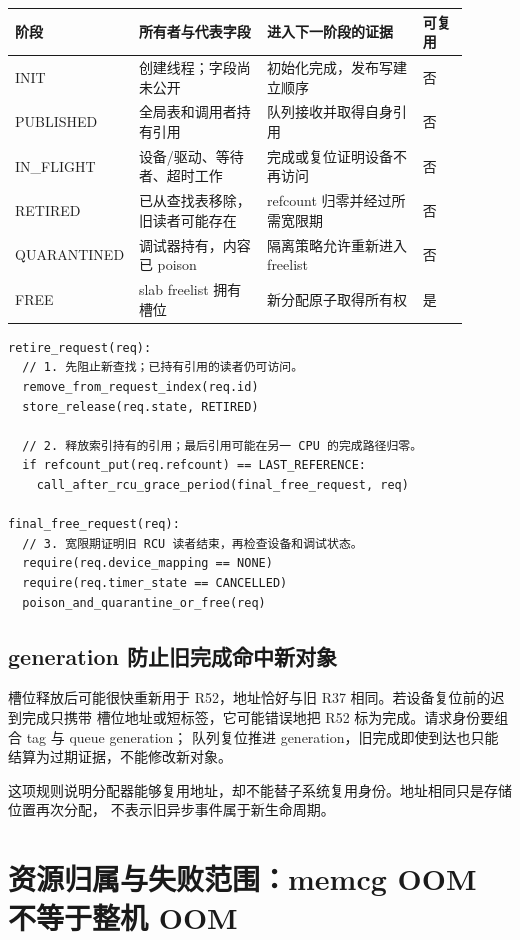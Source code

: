 \begin{longtable}{|L{0.18\linewidth}|L{0.28\linewidth}|L{0.34\linewidth}|L{0.1\linewidth}|}
\hline
阶段 & 所有者与代表字段 & 进入下一阶段的证据 & 可复用 \\ \hline
INIT & 创建线程；字段尚未公开 & 初始化完成，发布写建立顺序 & 否 \\\tablerowrule
PUBLISHED & 全局表和调用者持有引用 & 队列接收并取得自身引用 & 否 \\\tablerowrule
IN\_FLIGHT & 设备/驱动、等待者、超时工作 & 完成或复位证明设备不再访问 & 否 \\\tablerowrule
RETIRED & 已从查找表移除，旧读者可能存在 & refcount 归零并经过所需宽限期 & 否 \\\tablerowrule
QUARANTINED & 调试器持有，内容已 poison & 隔离策略允许重新进入 freelist & 否 \\\tablerowrule
FREE & slab freelist 拥有槽位 & 新分配原子取得所有权 & 是 \\
\hline
\end{longtable}

\begin{lstlisting}
retire_request(req):
  // 1. 先阻止新查找；已持有引用的读者仍可访问。
  remove_from_request_index(req.id)
  store_release(req.state, RETIRED)

  // 2. 释放索引持有的引用；最后引用可能在另一 CPU 的完成路径归零。
  if refcount_put(req.refcount) == LAST_REFERENCE:
    call_after_rcu_grace_period(final_free_request, req)

final_free_request(req):
  // 3. 宽限期证明旧 RCU 读者结束，再检查设备和调试状态。
  require(req.device_mapping == NONE)
  require(req.timer_state == CANCELLED)
  poison_and_quarantine_or_free(req)
\end{lstlisting}

\subsection{generation 防止旧完成命中新对象}

槽位释放后可能很快重新用于 R52，地址恰好与旧 R37 相同。若设备复位前的迟到完成只携带
槽位地址或短标签，它可能错误地把 R52 标为完成。请求身份要组合 tag 与 queue generation；
队列复位推进 generation，旧完成即使到达也只能结算为过期证据，不能修改新对象。

这项规则说明分配器能够复用地址，却不能替子系统复用身份。地址相同只是存储位置再次分配，
不表示旧异步事件属于新生命周期。

\section{资源归属与失败范围：memcg OOM 不等于整机 OOM}

